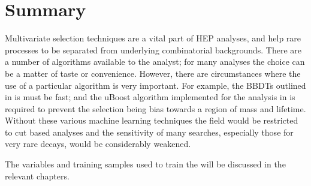 \section{Summary}
Multivariate selection techniques are a vital part of \gls{HEP} analyses, and help rare
processes to be separated from underlying combinatorial backgrounds.
There are a number of algorithms available to the analyst; for many analyses the choice can be a
matter of taste or convenience.
However, there are circumstances where the use of a particular algorithm is very important.
For example, the \glspl{BBDT} outlined in  is must be fast; and the uBoost
algorithm implemented for the analysis in  is required to prevent the selection being
bias towards a region of mass and lifetime.
Without these various machine learning techniques the field would be restricted to cut based
analyses and the sensitivity of many searches, especially those for very rare decays, would be
considerably weakened.

The variables and training samples used to train the \BDTs will be discussed in the relevant
chapters.
